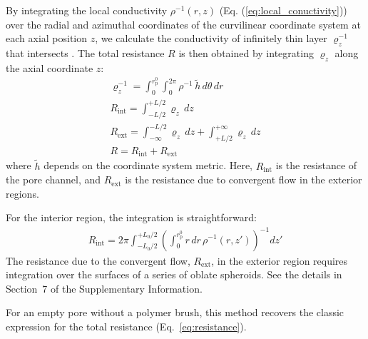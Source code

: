 \documentclass[12pt, a4paper]{article}
\begin{document}
By integrating the local conductivity $\rho^{-1}(r,z)$ (Eq. (\ref{eq:local_conuctivity})) over the radial and azimuthal coordinates of the curvilinear coordinate system at each axial position $z$, we calculate the conductivity of infinitely thin layer $\varrho_{z}^{-1}$ that intersects .
The total resistance $R$ is then obtained by integrating $\varrho_{z}$ along the axial coordinate $z$:
\begin{eqnarray}
    \label{eq:R_z_inv}
    \varrho_{z}^{-1} = \int_{0}^{r_{\text{p}}^{0}}\int_{0}^{2\pi}\rho^{-1} \, \tilde{h} \, d\theta \, dr\\
    \label{eq:R_z_pore}
    R_{\text{int}} = \int_{-L/2}^{+L/2} \varrho_{z} \, dz\\
    \label{eq:R_z_conv}
    R_{\text{ext}} = \int_{-\infty}^{-L/2} \varrho_{z} \, dz + \int_{+L/2}^{+\infty} \varrho_{z} \, dz\\
    \label{eq:R_z_tot}
    R = R_{\text{int}} + R_{\text{ext}}
\end{eqnarray}
where $\tilde{h}$ depends on the coordinate system metric. Here, $R_{\text{int}}$ is the resistance of the pore channel, and $R_{\text{ext}}$ is the resistance due to convergent flow in the exterior regions.


For the interior region, the integration is straightforward:
\begin{eqnarray}
    R_{\text{int}} = 2\pi\int_{-L_{0}/2}^{+L_{0}/2}\left(\int_{0}^{r_{\text{p}}^{0}} r \, dr \, \rho^{-1}(r, z')\right)^{-1} dz'
    \label{eq:R_pore}
\end{eqnarray}
The resistance due to the convergent flow, $R_{\text{ext}}$, in the exterior region requires integration over the surfaces of a series of oblate spheroids.
See the details in Section~7 of the Supplementary Information.

For an empty pore without a polymer brush, this method recovers the classic expression for the total resistance (Eq.~\ref{eq:resistance}).
\end{document}
